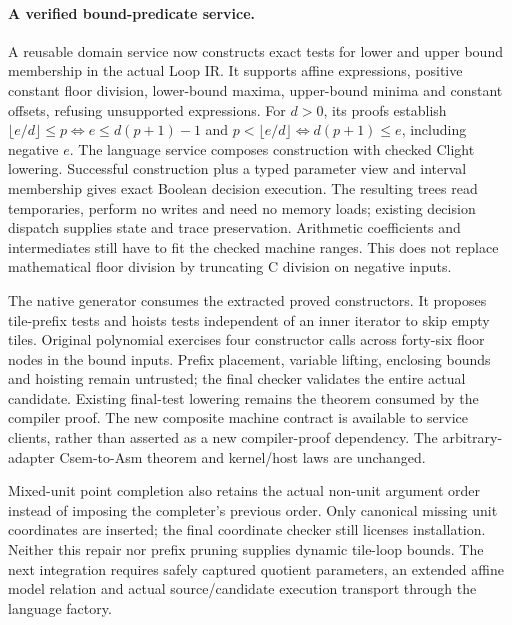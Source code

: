 \paragraph{A verified bound-predicate service.}
A reusable domain service now constructs exact tests for lower and upper bound
membership in the actual Loop IR. It supports affine expressions, positive
constant floor division, lower-bound maxima, upper-bound minima and constant
offsets, refusing unsupported expressions. For $d>0$, its proofs establish
$\lfloor e/d\rfloor\leq p\iff e\leq d(p+1)-1$ and
$p<\lfloor e/d\rfloor\iff d(p+1)\leq e$, including negative $e$.
The language service composes construction with checked Clight lowering.
Successful construction plus a typed parameter view and interval membership
gives exact Boolean decision execution. The resulting trees read temporaries,
perform no writes and need no memory loads; existing decision dispatch supplies
state and trace preservation. Arithmetic coefficients and intermediates still
have to fit the checked machine ranges. This does not replace mathematical
floor division by truncating C division on negative inputs.

The native generator consumes the extracted proved constructors. It proposes
tile-prefix tests and hoists tests independent of an inner iterator to skip
empty tiles. Original polynomial exercises four constructor calls across
forty-six floor nodes in the bound inputs. Prefix placement, variable lifting,
enclosing bounds and hoisting remain untrusted; the final checker validates the
entire actual candidate. Existing final-test lowering remains the theorem
consumed by the compiler proof. The new composite machine contract is available
to service clients, rather than asserted as a new compiler-proof dependency.
The arbitrary-adapter Csem-to-Asm theorem and kernel/host laws are unchanged.

Mixed-unit point completion also retains the actual non-unit argument order
instead of imposing the completer's previous order. Only canonical missing
unit coordinates are inserted; the final coordinate checker still licenses
installation. Neither this repair nor prefix pruning supplies dynamic tile-loop
bounds. The next integration requires safely captured quotient parameters,
an extended affine model relation and actual source/candidate execution
transport through the language factory.

